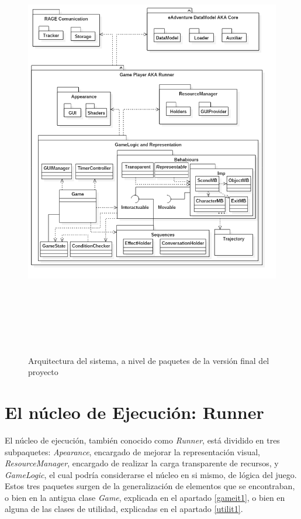 \begin{figure}[h!]
	\centerline{\includegraphics[height=7.5in]{figures/it2/Arquitectura.png}}
	\caption[Arquitectura - Versión Final]{Arquitectura del sistema, a nivel de paquetes de la versión final del proyecto}
	\label{arquitecturait2}
\end{figure}

\newpage

\section{El núcleo de Ejecución: Runner}
\label{runnerit2}

El núcleo de ejecución, también conocido como \textit{Runner}, está dividido en tres subpaquetes: \textit{Apearance}, encargado de mejorar la representación visual, \textit{ResourceManager}, encargado de realizar la carga transparente de recursos, y \textit{GameLogic}, el cual podría considerarse el núcleo en si mismo, de lógica del juego. Estos tres paquetes surgen de la generalización de elementos que se encontraban, o bien en la antigua clase \textit{Game}, explicada en el apartado \ref{gameit1}, o bien en alguna de las clases de utilidad, explicadas en el apartado \ref{utilit1}.

